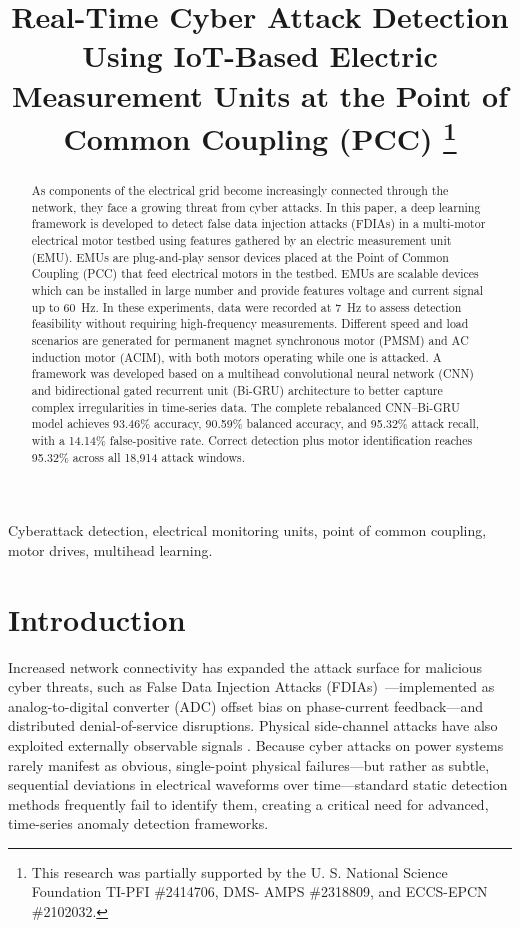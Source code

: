 \documentclass[conference]{IEEEtran}
\title{Real-Time Cyber Attack Detection Using IoT-Based Electric Measurement Units at the Point of Common Coupling (PCC)
\thanks{This research was partially supported by the  U. S. National Science Foundation TI-PFI \#2414706, DMS- AMPS \#2318809, and ECCS-EPCN \#2102032.}
}
\begin{document}
\author{
}
\maketitle
\pagestyle{plain}
\thispagestyle{plain}


\begin{abstract}
As components of the electrical grid become increasingly connected through the network, they face a growing threat from cyber attacks. In this paper, a deep learning framework is developed to detect false data injection attacks (FDIAs) in a multi-motor electrical motor testbed using features gathered by an electric measurement unit (EMU). EMUs are plug-and-play sensor devices placed at the Point of Common Coupling (PCC) that feed electrical motors in the testbed. EMUs are scalable devices which can be installed in large number and provide features voltage and current signal up to 60~Hz. In these experiments, data were recorded at 7~Hz to assess detection feasibility without requiring high-frequency measurements. Different speed and load scenarios are generated for permanent magnet synchronous motor (PMSM) and AC induction motor (ACIM), with both motors operating while one is attacked.
A framework was developed based on a multihead convolutional neural network (CNN) and bidirectional gated recurrent unit (Bi-GRU) architecture to better capture complex irregularities in time-series data. The complete rebalanced CNN--Bi-GRU model achieves 93.46\% accuracy, 90.59\% balanced accuracy, and 95.32\% attack recall, with a 14.14\% false-positive rate. Correct detection plus motor identification reaches 95.32\% across all 18,914 attack windows.
\end{abstract}

\begin{IEEEkeywords}
Cyberattack detection, electrical monitoring units, point of common coupling, motor drives, multihead learning.
\end{IEEEkeywords}

\section{Introduction}
Increased network connectivity has expanded the attack surface for malicious cyber threats, such as False Data Injection Attacks (FDIAs)~\cite{liu2009}---implemented as analog-to-digital converter (ADC) offset bias on phase-current feedback---and distributed denial-of-service disruptions. Physical side-channel attacks have also exploited externally observable signals \cite{Taheritajar2025Acoustic}. Because cyber attacks on power systems rarely manifest as obvious, single-point physical failures---but rather as subtle, sequential deviations in electrical waveforms over time---standard static detection methods frequently fail to identify them, creating a critical need for advanced, time-series anomaly detection frameworks.
\end{document}
